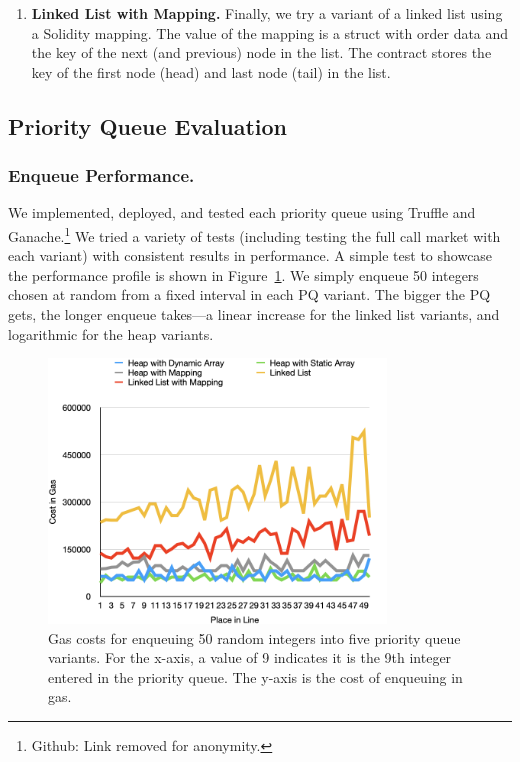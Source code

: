 \begin{enumerate}
\item \textbf{Linked List with Mapping.} Finally, we try a variant of a linked list using a Solidity mapping. The value of the mapping is a struct with order data and the key of the next (and previous) node in the list. The contract stores the key of the first node (head) and last node (tail) in the list. 

\end{enumerate}


\subsection{Priority Queue Evaluation} 

\subsubsection{Enqueue Performance.} We implemented, deployed, and tested each priority queue using Truffle and Ganache.\footnote{Github: Link removed for anonymity.} We tried a variety of tests (including testing the full call market with each variant) with consistent results in performance. A simple test to showcase the performance profile is shown in Figure~\ref{fig:random_insertion}. We simply enqueue 50 integers chosen at random from a fixed interval in each PQ variant. The bigger the PQ gets, the longer enqueue takes---a linear increase for the linked list variants, and logarithmic for the heap variants. 



\begin{figure}[t]
\centering
\includegraphics[width=0.8\textwidth]{fig/random_insertion2.png}
\caption{\footnotesize{Gas costs for enqueuing 50 random integers into five priority queue variants. For the x-axis, a value of 9 indicates it is the 9th integer entered in the priority queue. The y-axis is the cost of enqueuing in gas.}  \label{fig:random_insertion}}
\end{figure}



